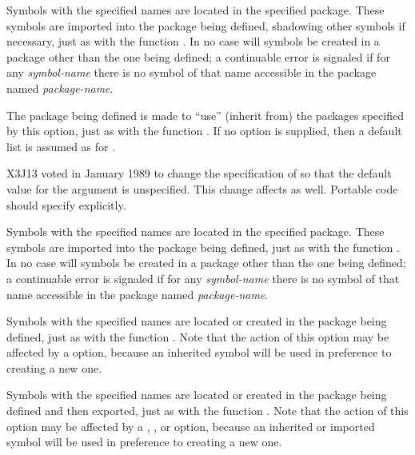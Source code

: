 \begin{new}
\begin{defmac}
\begin{flushdesc}
\item[\cd{(:shadowing-import-from {\it package-name} \Mstar{\it symbol-name})}]
Symbols with the specified names are located in the specified package.
These symbols are imported into the package being defined, shadowing
other symbols if necessary, just as with the function .
In no case will symbols be created in a package other than
the one being defined;
a continuable error is signaled if for any {\it symbol-name} there
is no symbol of that name accessible in the package named {\it package-name}.

\item[\cd{(:use \Mstar{\it package-name})}]
The package being defined is made to ``use'' (inherit from)
the packages specified by this option, just as with
the function .
If no  option is supplied, then a default list is assumed
as for .

X3J13 voted in January 1989
to change the specification of  so that the default value
for the  argument is unspecified.  This change affects 
as well.  Portable code should specify  explicitly.

\item[\cd{(:import-from {\it package-name} \Mstar{\it symbol-name})}]
Symbols with the specified names are located in the specified package.
These symbols are imported into the package being defined,
just as with the function .
In no case will symbols be created in a package other than
the one being defined;
a continuable error is signaled if for any {\it symbol-name} there
is no symbol of that name accessible in the package named {\it package-name}.

\item[\cd{(:intern \Mstar{\it symbol-name})}]
Symbols with the specified names are located or created
in the package being defined, just as with the function
.  Note that the action of this option may be
affected by a 
option, because an inherited symbol will be used in preference
to creating a new one.

\item[\cd{(:export \Mstar{\it symbol-name})}]
Symbols with the specified names are located or created
in the package being defined and then exported, just as with the function
.  Note that the action of this option may be
affected by a , , or 
option, because an inherited or imported symbol will be used in preference
to creating a new one.
\end{flushdesc}


\end{defmac}
\end{new}

